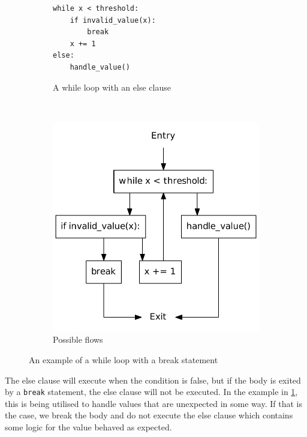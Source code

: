 \begin{figure}
  \centering
  \begin{subfigure}[b]{0.4\textwidth}
    \begin{lstlisting}[style=python]
while x < threshold:
    if invalid_value(x):
        break
    x += 1
else:
    handle_value()
    \end{lstlisting}
    \caption{A while loop with an else clause}\label{surprise_while_else}
    \end{subfigure}
  ~
    \begin{subfigure}[b]{0.4\textwidth}
      \includegraphics[scale=.5]{./figures/while_break.pdf}
      \caption{Possible flows}\label{surprise_while_else_cfg}
    \end{subfigure}
    
  \caption{An example of a while loop with a break statement}
\end{figure}


The else clause will execute when the condition is false, but if the body is exited by a \texttt{break} statement, the else clause will not be executed.
In the example in \cref{surprise_while_else}, this is being utilised to handle values that are unexpected in some way.
If that is the case, we break the body and do not execute the else clause which contains some logic for the value behaved as expected.

